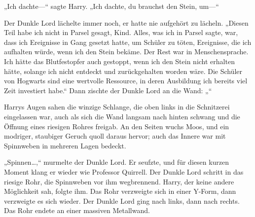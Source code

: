 „Ich dachte—“ sagte Harry. „Ich dachte, du brauchst den Stein, um—“

Der Dunkle Lord lächelte immer noch, er hatte nie aufgehört zu lächeln.
„Diesen Teil habe ich nicht in Parsel gesagt, Kind. Alles, was ich in Parsel sagte, war, dass ich Ereignisse in Gang gesetzt hatte, um Schüler zu töten, Ereignisse, die ich aufhalten würde, wenn ich den Stein bekäme. Der Rest war in Menschensprache. Ich hätte das Blutfestopfer auch gestoppt, wenn ich den Stein nicht erhalten hätte, solange ich nicht entdeckt und zurückgehalten worden wäre. Die Schüler von Hogwarts sind eine wertvolle Ressource, in deren Ausbildung ich bereits viel Zeit investiert habe.“
Dann zischte der Dunkle Lord an die Wand:
„“

Harrys Augen sahen die winzige Schlange, die oben links in die Schnitzerei eingelassen war, auch als sich die Wand langsam nach hinten schwang und die Öffnung eines riesigen Rohres freigab. An den Seiten wuchs Moos, und ein modriger, staubiger Geruch quoll daraus hervor; auch das Innere war mit Spinnweben in mehreren Lagen bedeckt.

„Spinnen…,“ murmelte der Dunkle Lord.
Er seufzte, und für diesen kurzen Moment klang er wieder wie Professor Quirrell.
Der Dunkle Lord schritt in das riesige Rohr, die Spinnweben vor ihm wegbrennend. Harry, der keine andere Möglichkeit sah, folgte ihm.
Das Rohr verzweigte sich in einer Y-Form, dann verzweigte es sich wieder. Der Dunkle Lord ging nach links, dann nach rechts. Das Rohr endete an einer massiven Metallwand.

